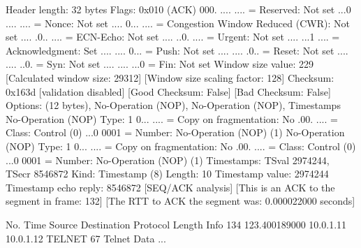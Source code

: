     Header length: 32 bytes
    Flags: 0x010 (ACK)
        000. .... .... = Reserved: Not set
        ...0 .... .... = Nonce: Not set
        .... 0... .... = Congestion Window Reduced (CWR): Not set
        .... .0.. .... = ECN-Echo: Not set
        .... ..0. .... = Urgent: Not set
        .... ...1 .... = Acknowledgment: Set
        .... .... 0... = Push: Not set
        .... .... .0.. = Reset: Not set
        .... .... ..0. = Syn: Not set
        .... .... ...0 = Fin: Not set
    Window size value: 229
    [Calculated window size: 29312]
    [Window size scaling factor: 128]
    Checksum: 0x163d [validation disabled]
        [Good Checksum: False]
        [Bad Checksum: False]
    Options: (12 bytes), No-Operation (NOP), No-Operation (NOP), Timestamps
        No-Operation (NOP)
            Type: 1
                0... .... = Copy on fragmentation: No
                .00. .... = Class: Control (0)
                ...0 0001 = Number: No-Operation (NOP) (1)
        No-Operation (NOP)
            Type: 1
                0... .... = Copy on fragmentation: No
                .00. .... = Class: Control (0)
                ...0 0001 = Number: No-Operation (NOP) (1)
        Timestamps: TSval 2974244, TSecr 8546872
            Kind: Timestamp (8)
            Length: 10
            Timestamp value: 2974244
            Timestamp echo reply: 8546872
    [SEQ/ACK analysis]
        [This is an ACK to the segment in frame: 132]
        [The RTT to ACK the segment was: 0.000022000 seconds]

No.     Time           Source                Destination           Protocol Length Info
    134 123.400189000  10.0.1.11             10.0.1.12             TELNET   67     Telnet Data ...

